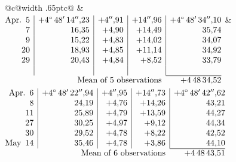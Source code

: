 \noindent\begin{tabular}{@{}c@{\hspace{.4em}\vrule width .65pt\hspace{.4em}}c@{}}
 &
 \\[.18ex]
\(\begin{array}[t]{@{}r|r|r|r|r@{}}
\text{Apr.}\enspace 5 & +4^\circ\,48'\,14''{,}23 & +4''{,}91 & +14''{,}96 & +4^\circ\,48'\,34''{,}10\\
7 & 16{,}35 & +4{,}90 & +14{,}49 & 35{,}74\\
9 & 15{,}22 & +4{,}83 & +14{,}02 & 34{,}07\\
20 & 18{,}93 & +4{,}85 & +11{,}14 & 34{,}92\\
29 & 20{,}43 & +4{,}84 & +8{,}52 & 33{,}79\\
 & & & & \\
\cline{5-5}
\multicolumn{4}{r}{\text{Mean of 5 observations}} & +4\,48\,34{,}52
\end{array}\)
&
\(\begin{array}[t]{@{}r|r|r|r|r@{}}
\text{Apr.}\enspace 6 & +4^\circ\,48'\,22''{,}94 & +4''{,}95 & +14''{,}73 & +4^\circ\,48'\,42''{,}62\\
8 & 24{,}19 & +4{,}76 & +14{,}26 & 43{,}21\\
11 & 25{,}89 & +4{,}79 & +13{,}59 & 44{,}27\\
27 & 30{,}25 & +4{,}97 & +9{,}12 & 44{,}34\\
30 & 29{,}52 & +4{,}78 & +8{,}22 & 42{,}52\\
\text{May}\enspace 14 & 35{,}46 & +4{,}78 & +3{,}86 & 44{,}10\\
\cline{5-5}
\multicolumn{4}{r}{\text{Mean of 6 observations}} & +4\,48\,43{,}51
\end{array}\)
\end{tabular}\par\medskip

\par\clearpage
\noindent\makebox[12mm][l]{}\par\medskip

